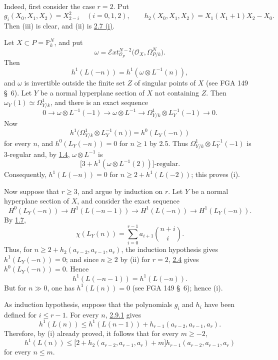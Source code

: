Indeed, first consider the case \(r=2\). Put
\[
g_i(X_0,X_1,X_2)=X_{2-i}^2\quad(i=0,1,2),
\qquad
h_2(X_0,X_1,X_2)=X_1(X_1+1)X_2-X_0.
\]
Then (iii) is clear, and (ii) is \hyperlink{sga6.e13.lem.2-7}{2.7 (i)}.

Let \(X\subset P=\mathbb P_k^N\), and put
\[
\omega=
\mathcal E\!xt_{\mathcal O_P}^{N-2}
\bigl(\mathcal O_X,\Omega^N_{P/k}\bigr).
\]
Then
\[
h^1(L(-n))=h^1(\omega\otimes L^{-1}(n)),
\]
and \(\omega\) is invertible outside the finite set \(Z\) of singular
points of \(X\) (see FGA 149 \S~6). Let \(Y\) be a normal hyperplane
section of \(X\) not containing \(Z\). Then
\(\omega_Y(1)\simeq\Omega^1_{Y/k}\), and there is an exact sequence
\[
0\longrightarrow\omega\otimes L^{-1}(-1)
\longrightarrow\omega\otimes L^{-1}
\longrightarrow\Omega^1_{Y/k}\otimes L_Y^{-1}(-1)
\longrightarrow0.
\]
Now
\[
h^1\bigl(\Omega^1_{Y/k}\otimes L_Y^{-1}(n)\bigr)
=h^0(L_Y(-n))
\]
for every \(n\), and \(h^0(L_Y(-n))=0\) for \(n\ge1\) by 2.5. Thus
\(\Omega^1_{Y/k}\otimes L_Y^{-1}(-1)\) is 3-regular and, by \hyperlink{sga6.e13.prop.1-4}{1.4},
\(\omega\otimes L^{-1}\) is
\[
\bigl[3+h^1(\omega\otimes L^{-1}(2))\bigr]\text{-regular}.
\]
Consequently, \(h^1(L(-n))=0\) for
\(n\ge2+h^1(L(-2))\); this proves (i).

Now suppose that \(r\ge3\), and argue by induction on \(r\). Let \(Y\)
be a normal hyperplane section of \(X\), and consider the exact sequence
\begin{equation}
H^0(L_Y(-n))\longrightarrow H^1(L(-n-1))
\longrightarrow H^1(L(-n))\longrightarrow H^1(L_Y(-n)).
\tag{2.9.1}
\end{equation}
By \hyperlink{sga6.e13.lem.1-7}{1.7},
\[
\chi(L_Y(n))=
\sum_{i=0}^{r-1}a_{i+1}\binom{n+i}{i}.
\]
Thus, for \(n\ge2+h_2(a_{r-2},a_{r-1},a_r)\), the induction
hypothesis gives \(h^1(L_Y(-n))=0\); and since \(n\ge2\) by (ii) for
\(r=2\), \hyperlink{sga6.e13.lem.2-4}{2.4} gives \(h^0(L_Y(-n))=0\). Hence
\[
h^1(L(-n-1))=h^1(L(-n)).
\]
But for \(n\gg0\), one has \(h^1(L(n))=0\) (see FGA 149 \S~6); hence
(i).

As induction hypothesis, suppose that the polynomials \(g_i\) and \(h_i\)
have been defined for \(i\le r-1\). For every \(n\), \hyperlink{sga6.e13.eq.2-9-1}{2.9.1} gives
\[
h^1(L(n))\le h^1(L(n-1))
+h_{r-1}(a_{r-2},a_{r-1},a_r).
\]
Therefore, by (i)
already proved, it follows that for every \(m\ge-2\),
\begin{equation}
h^1(L(n))\le
\bigl[2+h_2(a_{r-2},a_{r-1},a_r)+m\bigr]
h_{r-1}(a_{r-2},a_{r-1},a_r)
\tag{2.9.2}
\end{equation}
for every \(n\le m\).

